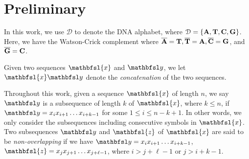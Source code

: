 \documentclass[conference]{IEEEtran}
\theoremstyle{plain}
\theoremstyle{definition}
\newcommand{\D}{{\mathcal D}}
\newcommand{\by}{{\mathbfsl y}}
\newcommand{\bx}{{\mathbfsl{x}}}
\newcommand{\bz}{{\mathbfsl{z}}}
\renewcommand{\le}{\leqslant}
\begin{document}



 


\section{Preliminary}\label{sec:prelim}
In this work, we use $\D$ to denote the DNA alphabet, where $\D=\{{\bf A}, {\bf T}, {\bf C}, {\bf G}\}$. Here, we have the Watson-Crick complement where $\overline{{\bf A}}={\bf T}, \overline{\bf T}={\bf A}, \overline{\bf C}={\bf G}$, and $\overline{\bf G}={\bf C}$. 

Given two sequences $\bx$ and $\by$, we let $\bx\by$ denote the {\em concatenation} of the two sequences. 

Throughout this work, given a sequence $\bx$ of length $n$, we say $\by$ is a subsequence of length $k$ of $\bx$, where $k\le n$, if $\by=x_ix_{i+1}\ldots x_{i+k-1}$ for some $1\le i\le n-k+1$. In other words, we only consider the subsequences including consecutive symbols in $\bx$. Two subsequences $\by$ and $\bz$ of $\bx$ are said to be {\em non-overlapping} if we have $\by=x_ix_{i+1}\ldots x_{i+k-1}$, $\bz=x_jx_{j+1}\ldots x_{j+\ell-1}$, where $i>j+\ell-1$ or $j>i+k-1$.

\end{document}
